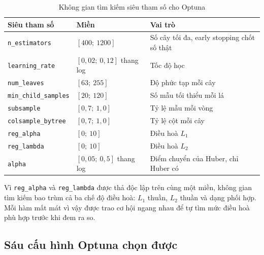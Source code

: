 \documentclass[12pt, a4paper]{report}
\begin{document}
\begin{table}[htbp]
\centering
\caption{Không gian tìm kiếm siêu tham số cho Optuna}
\label{tab:mien_optuna}
\small
\begin{tabular}{l l l}
\toprule
\textbf{Siêu tham số} & \textbf{Miền} & \textbf{Vai trò} \\
\midrule
\texttt{n\_estimators}     & $[400;\ 1200]$ & Số cây tối đa, early stopping chốt số thật \\
\texttt{learning\_rate}    & $[0{,}02;\ 0{,}12]$ thang log & Tốc độ học \\
\texttt{num\_leaves}       & $[63;\ 255]$ & Độ phức tạp mỗi cây \\
\texttt{min\_child\_samples} & $[20;\ 120]$ & Số mẫu tối thiểu mỗi lá \\
\texttt{subsample}         & $[0{,}7;\ 1{,}0]$ & Tỷ lệ mẫu mỗi vòng \\
\texttt{colsample\_bytree} & $[0{,}7;\ 1{,}0]$ & Tỷ lệ cột mỗi cây \\
\texttt{reg\_alpha}        & $[0;\ 10]$ & Điều hoà $L_1$ \\
\texttt{reg\_lambda}       & $[0;\ 10]$ & Điều hoà $L_2$ \\
\texttt{alpha}             & $[0{,}05;\ 0{,}5]$ thang log & Điểm chuyển của Huber, chỉ Huber có \\
\bottomrule
\end{tabular}


\end{table}

Vì \texttt{reg\_alpha} và \texttt{reg\_lambda} được thả độc lập trên cùng một miền, không gian
tìm kiếm bao trùm cả ba chế độ điều hoà: $L_1$ thuần, $L_2$ thuần và dạng phối hợp. Mỗi hàm mất
mát vì vậy được trao cơ hội ngang nhau để tự tìm mức điều hoà phù hợp trước khi đem ra so.

\FloatBarrier
\subsection{Sáu cấu hình Optuna chọn được}
\end{document}

